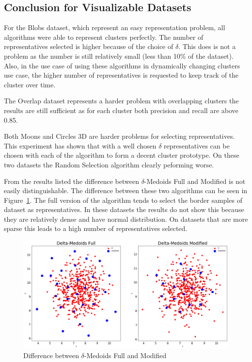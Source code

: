 \documentclass[thesis=B,english]{FITthesis}[2012/10/20]
\begin{document}
\subsection{Conclusion for Visualizable Datasets}
For the Blobs dataset, which represent an easy representation problem, all algorithms were able to represent clusters perfectly.
The number of representatives selected is higher because of the choice of $\delta$.
This does is not a problem as the number is still relatively small (less than 10\% of the dataset).
Also, in the use case of using these algorithms in dynamically changing clusters use case, the higher number of representatives is requested to keep track of the cluster over time.

The Overlap dataset represents a harder problem with overlapping clusters the results are still sufficient as for each cluster both precision and recall are above 0.85.

Both Moons and Circles 3D are harder problems for selecting representatives.
This experiment has shown that with a well chosen $\delta$ representatives can be chosen with each of the algorithm to form a decent cluster prototype.
On these two datasets the Random Selection algorithm clearly peforming worse. 

From the results listed the difference between $\delta$-Medoids Full and Modified is not easily distinguishable.
The difference between these two algorithms can be seen in Figure~\ref{img:difference_modified}.
The full version of the algorithm tends to select the border samples of dataset as representatives.
In these datasets the results do not show this because they are relatively dense and have normal distribution.
On datasets that are more sparse this leads to a high number of representatives selected.

\begin{figure}[t]
   \includegraphics[width=\linewidth]{img/delta_medoids_select.png}
  \caption{Difference between $\delta$-Medoids Full and Modified}
  \label{img:difference_modified}
\end{figure}
\end{document}

